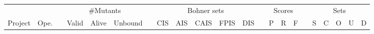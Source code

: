 \documentclass[]{article}
\begin{document}
	
	\begin{table}[htbp]
		\centering
		\scriptsize
		
		\begin{tabular}{@{}lrrrrrrrrrrrrrrrrrrrrr@{}}
			
			\toprule
			& & & \multicolumn{3}{c}{\#Mutants} & & \multicolumn{5}{c}{Bohner sets} & & \multicolumn{3}{c}{Scores} & & \multicolumn{5}{c}{Sets} \\
						\cmidrule{4-6} 
						\cmidrule{8-12}
						\cmidrule{14-16}
						\cmidrule{18-22}
			Project & Ope. &\phantom{}& Valid & Alive & Unbound &\phantom{}& CIS & AIS & CAIS & FPIS & DIS &\phantom{}& P & R & F &\phantom{}& S & C & O & U & D \\
			
		
			\bottomrule	
		\end{tabular}
	\end{table}
	
	\pagebreak
	
\end{document}
